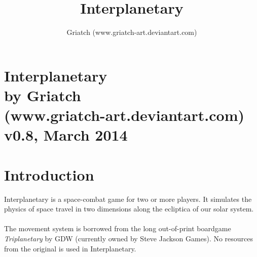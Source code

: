 \documentclass[a4paper,12pt,notitlepage,twocolumn]{article}
\title{Interplanetary}
\author{Griatch (www.griatch-art.deviantart.com)}   %
\begin{document}



\section*{\center Interplanetary\\by Griatch \\
   {\small (www.griatch-art.deviantart.com)}\\ {\small v0.8, March 2014}}

\section{Introduction}
Interplanetary is a
space-combat game for two or more players. It simulates the physics of
space travel in two dimensions along the ecliptica of our solar
system. 
\\\\

The movement system is borrowed from the long out-of-print boardgame 
\emph{Triplanetary} by GDW (currently owned by Steve Jackson Games). No resources 
from the original is used in Interplanetary.
\end{document}
